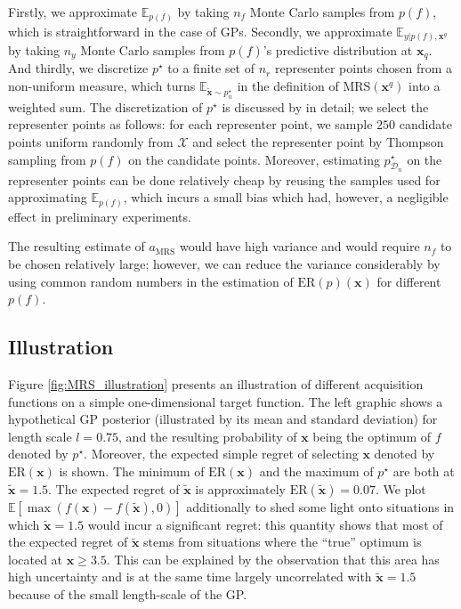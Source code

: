 \documentclass[10pt,letterpaper]{article} %
\begin{document}
Firstly, we approximate $\mathbb{E}_{p(f)}$ by taking $n_f$ Monte Carlo samples
from $p(f)$, which is straightforward in the case of GPs.
Secondly, we approximate $\mathbb{E}_{y \vert p(f), \mathbf{x}^q}$  by taking
$n_y$ Monte Carlo samples from $p(f)$'s predictive distribution at
$\mathbf{x}_q$. And thirdly, we discretize $p^\star$ to a finite set of $n_r$
representer points chosen from a non-uniform measure, which turns
$\mathbb{E}_{\mathbf{\tilde x} \sim p^\star_n}$ in the definition of
$\text{MRS}(\mathbf{x}^q)$ into a weighted sum. The discretization of $p^\star$ is discussed by
\citet{hennig_entropy_2012} in detail; we select the representer points as
follows: for each representer point, we sample $250$ candidate points uniform
randomly from $\mathcal{X}$ and select the representer point by Thompson
sampling from $p(f)$ on the candidate points. Moreover, estimating $p^\star_{\mathcal{D}_n}$ 
on the representer points can be done relatively cheap by reusing the samples used 
for approximating $\mathbb{E}_{p(f)}$, which incurs a small bias which had, however, a negligible 
effect in preliminary experiments.

The resulting estimate of $a_{\text{MRS}}$ would have high variance and would require $n_f$ to be
chosen relatively large; however, we can reduce the variance considerably by using
common random numbers \citep{kahn_methods_1953} in the estimation of
$\text{ER}(p)(\mathbf{x})$ for different $p(f)$.


\subsection{Illustration} \label{Section:MRS_Illustration}

Figure \ref{fig:MRS_illustration} presents an illustration of different
acquisition functions on a simple one-dimensional target function. The left
graphic shows a hypothetical GP posterior (illustrated by its mean and standard
deviation) for length scale $l=0.75$, and the resulting probability of $\mathbf{x}$
being the optimum of $f$ denoted by $p^\star$.
Moreover, the expected simple regret of selecting $\mathbf{x}$ denoted by
$\text{ER}(\mathbf{x})$ is shown. The minimum of $\text{ER}(\mathbf{x})$ and the maximum
of $p^\star$ are both at $\mathbf{\tilde x}=1.5$. The expected regret of $\mathbf{\tilde x}$
is approximately $\text{ER}(\mathbf{\tilde x}) = 0.07$. We plot $\mathbb{E}[\max(f(\mathbf{x}) -
f(\mathbf{\tilde x}), 0)]$ additionally to shed some light onto situations in which $
\mathbf{\tilde x} = 1.5$ would incur a significant regret: this quantity shows that most of the
expected regret of $\mathbf{\tilde x}$ stems from situations where the ``true''
optimum is located at $\mathbf{x} \geq 3.5$. This can be explained by the
observation that this area has high uncertainty and is at the same time largely
uncorrelated with $\mathbf{\tilde x} = 1.5$ because of the small length-scale of the GP.
\end{document}
